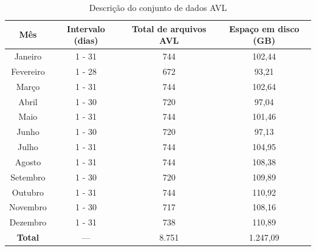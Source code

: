 \documentclass[
	12pt,				%
	oneside,			%
	a4paper,			%
	english,			%
	brazil				%
	]{abntex2ppgsi}
\begin{document}
{{{\begin{table}[!htb]
\begin{threeparttable}
\centering
\caption{Descrição do conjunto de dados AVL}
\label{tab:avlDataset}
\begin{tabular}{ c | c | c | c }
\toprule
\textbf{Mês} & \textbf{Intervalo (dias)} & \textbf{Total de arquivos AVL} & \textbf{Espaço em disco (GB)} \\
\midrule
Janeiro\tnote{a} & 1 - 31 & 744 & 102,44 \\
\hline
 Fevereiro & 1 - 28 & 672 & 93,21 \\
\hline
 Março & 1 - 31 & 744 & 102,64 \\
\hline
 Abril & 1 - 30 & 720 & 97,04 \\
\hline
 Maio & 1 - 31 & 744 & 101,46 \\
\hline
 Junho & 1 - 30 & 720 & 97,13 \\
\hline
 Julho & 1 - 31 & 744 & 104,95 \\
\hline
 Agosto & 1 - 31 & 744 & 108,38 \\
\hline
 Setembro & 1 - 30 & 720 & 109,89 \\
\hline
 Outubro & 1 - 31 & 744 & 110,92 \\
\hline
 Novembro & 1 - 30 & 717 & 108,16 \\
\hline
 Dezembro & 1 - 31 & 738 & 110,89 \\
\midrule
\midrule
\textbf{Total} & --- & 8.751 & 1.247,09 \\
\bottomrule
\end{tabular}
\begin{tablenotes}

\end{tablenotes}
\end{threeparttable}
\end{table}}}}
\end{document}
